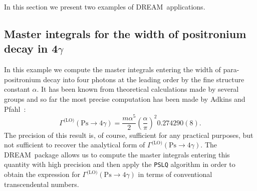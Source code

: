 \documentclass[sort&compress]{elsarticle}
\begin{document}
In this section we present two examples of DREAM\ applications.

\subsection{Master integrals for the width of positronium decay in 4$\gamma$}

In this example we compute the master integrals entering the width of para-positronium decay into four photons at the leading order by the fine structure constant $\alpha$.
It has been known from theoretical calculations made by several groups \cite{Billoire:1978:pPs4gamma-LO,MutaNiuya:1982:pPs4gamma-LO,Lepage:1983:pPs4gamma-LO,AdkinsPfahl:1999:pPs4gamma-NLO}
and so far the most precise computation has been made by Adkins and Pfahl~\cite{AdkinsPfahl:1999:pPs4gamma-NLO}:
\begin{equation}
	\label{eq:adkins-pfahl}
	\Gamma^{\text{(LO)}}(\mathrm{Ps}\to4\gamma) = \frac{m\alpha^5}{2} \left(\frac{\alpha}{\pi}\right)^2 0.274290(8).
\end{equation}
The precision of this result is, of course, sufficient for any practical purposes, but not sufficient to recover the analytical form of $\Gamma^{\text{(LO)}}(\mathrm{Ps}\to4\gamma)$.
The DREAM\ package allows us to compute the master integrals entering this quantity with high precision and then apply the \texttt{PSLQ} algorithm \cite{FergusonBailey:1992:PSLQ} in order to obtain the expression for $\Gamma^{\text{(LO)}}(\mathrm{Ps}\to4\gamma)$ in terms of conventional transcendental numbers.
\end{document}
